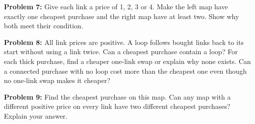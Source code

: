 \documentclass[12pt,letterpaper]{article}
\newcommand\problem[2]{\textbf{Problem #1:} #2\par}
\begin{document}
\problem{7}{Give each link a price of 1, 2, 3 or 4. Make the left map have exactly one cheapest purchase and the right map have at least two. Show why both meet their condition.}
\vspace{0.75in}
\begin{center}
\begin{minipage}{0.48\linewidth}\centering\PriceDesign\end{minipage}\hfill
\begin{minipage}{0.48\linewidth}\centering\PriceDesign\end{minipage}
\end{center}
\newpage

\problem{8}{All link prices are positive. A loop follows bought links back to its start without using a link twice. Can a cheapest purchase contain a loop? For each thick purchase, find a cheaper one-link swap or explain why none exists. Can a connected purchase with no loop cost more than the cheapest one even though no one-link swap makes it cheaper?}
\vspace{0.35in}
\begin{center}\SixGood\end{center}
\vspace{0.25in}
\begin{center}\SixBad\end{center}
\newpage

\problem{9}{Find the cheapest purchase on this map. Can any map with a different positive price on every link have two different cheapest purchases? Explain your answer.}
\vspace{0.4in}
\begin{center}\Distinct\end{center}
\end{document}
